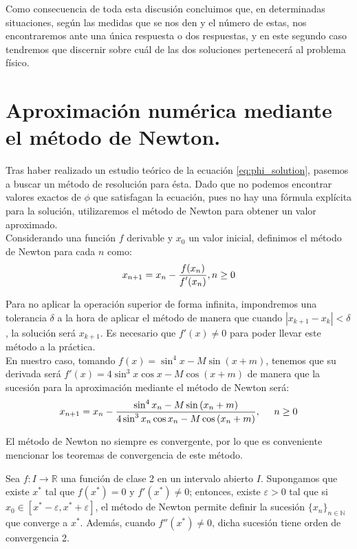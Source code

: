 Como consecuencia de toda esta discusión concluimos que, en determinadas situaciones, según las medidas que se nos den y el número de estas, nos encontraremos ante una única respuesta o dos respuestas, y en este segundo caso tendremos que discernir sobre cuál de las dos soluciones pertenecerá al problema físico.\\


\section{Aproximación numérica mediante el método de Newton.}
\label{sec:newton_rhapson}
Tras haber realizado un estudio teórico de la ecuación \eqref{eq:phi_solution}, pasemos a buscar un método de resolución para ésta. Dado que no podemos encontrar valores exactos de $\phi$ que satisfagan la ecuación, pues no hay una fórmula explícita para la solución, utilizaremos el método de Newton para obtener un valor aproximado.\\

Considerando una función $f$ derivable y $x_0$ un valor inicial, definimos el método de Newton para cada $n$ como:
\[
x_{n+1}=x_n-\frac{\displaystyle f(x_n)}{\displaystyle f'(x_n)}, n\geq0
\]

Para no aplicar la operación superior de forma infinita, impondremos una tolerancia $\delta$ a la hora de aplicar el método de manera que cuando $|x_{k+1}-x_k|<\delta$, la solución será $x_{k+1}$. Es necesario que $f'(x)\neq0$ para poder llevar este método a la práctica.\\

En nuestro caso, tomando $f(x)=\sin^4{x}-M\sin{(x+m)}$, tenemos que su derivada será $f'(x)=4\sin^3{x}\cos{x}-M\cos{(x+m)}$ de manera que la sucesión para la aproximación mediante el método de Newton será:
\begin{align}
x_{n+1}=x_n-\frac{\displaystyle \sin^4{x_n}-M\sin{(x_n+m)}}{\displaystyle 4\sin^3{x_n}\cos{x_n}-M\cos{(x_n+m)}}, \; \; \; \; \; n\geq0
\label{eq:phi_newton}
\end{align}

El método de Newton no siempre es convergente, por lo que es conveniente mencionar los teoremas de convergencia de este método. 
\begin{theorem}
\label{theo:convergence_newton}
Sea $f:I\rightarrow\mathbb{R}$ una función de clase 2 en un intervalo abierto $I$. Supongamos que existe $x^*$ tal que $f(x^*)=0$ y $f'(x^*)\neq0$; entonces, existe $\varepsilon>0$ tal que si $x_0\in[x^*-\varepsilon,x^*+\varepsilon]$, el método de Newton permite definir la sucesión $\{x_n\}_{n\in\mathbb{N}}$ que converge a $x^*$. Además, cuando $f''(x^*)\neq0$, dicha sucesión tiene orden de convergencia 2.\\
\end{theorem}

